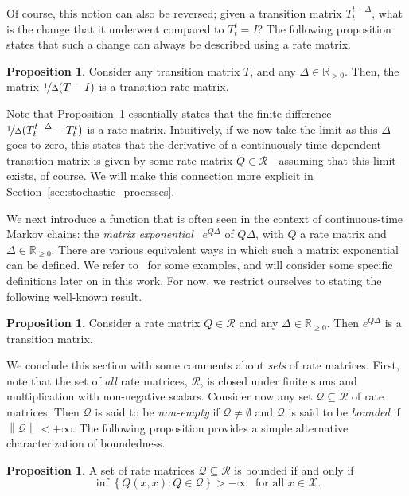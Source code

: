 \documentclass[10pt,a4paper]{paper}
\theoremstyle{definition}
\newtheorem{proposition}[theorem]{Proposition}
\newcommand{\reals}{\mathbb{R}}
\newcommand{\realspos}{\reals_{>0}}
\newcommand{\realsnonneg}{\reals_{\geq 0}}
\newcommand{\states}{\mathcal{X}}
\newcommand{\rateset}{\mathcal{Q}}
\newcommand{\norm}[1]{\left\lVert #1 \right\rVert}
\begin{document}
Of course, this notion can also be reversed; given a transition matrix $T_t^{t+\Delta}$, what is the change that it underwent compared to $T_t^t=I$? The following proposition states that such a change can always be described using a rate matrix.
\begin{proposition}\label{prop:rate_from_stochastic_matrix}
Consider any transition matrix $T$, and any $\Delta\in\realspos$. Then, the matrix $\nicefrac{1}{\Delta}(T-I)$ is a transition rate matrix.
\end{proposition}
Note that Proposition~\ref{prop:rate_from_stochastic_matrix} essentially states that the finite-difference $\nicefrac{1}{\Delta}(T_t^{t+\Delta} - T_t^t)$ is a rate matrix. Intuitively, if we now take the limit as this $\Delta$ goes to zero, this states that the derivative of a continuously time-dependent transition matrix is given by some rate matrix $Q\in\mathcal{R}$---assuming that this limit exists, of course. We will make this connection more explicit in Section~\ref{sec:stochastic_processes}.

We next introduce a function that is often seen in the context of continuous-time Markov chains: the \emph{matrix exponential}~\cite{van2006study} $e^{Q\Delta}$ of $Q \Delta$, with $Q$ a rate matrix and $\Delta\in\reals_{\geq0}$. %
There are various equivalent ways in which such a matrix exponential can be defined. We refer to~\cite{van2006study} for some examples, and will consider some specific definitions later on in this work.
For now, we restrict ourselves to stating the following well-known result.
\begin{proposition}\cite[Theorem 2.1.2]{norris1998markov}\label{prop:stochastic_from_exponential}
Consider a rate matrix $Q\in\mathcal{R}$ and any $\Delta\in\realsnonneg$. Then $e^{Q\Delta}$ is a transition matrix.
\end{proposition}

We conclude this section with some comments about \emph{sets} of rate matrices. First, note that the set of \emph{all} rate matrices, $\mathcal{R}$, is closed under finite sums and multiplication with non-negative scalars. Consider now any set $\rateset\subseteq\mathcal{R}$ of rate matrices. Then $\rateset$ is said to be \emph{non-empty} if $\rateset\neq\emptyset$ and $\rateset$ is said to be \emph{bounded} if $\norm{\rateset}<+\infty$. The following proposition provides a simple alternative characterization of boundedness.

\begin{proposition}\label{prop:alternativedefforbounded}
A set of rate matrices $\rateset\subseteq\mathcal{R}$ is bounded if and only if
\begin{equation}\label{eq:alternative_bounded}
\inf\left\{Q(x,x)\colon Q\in\rateset\right\}>-\infty\text{~~for all $x\in\states$.}
\end{equation}
\end{proposition}
\end{document}
